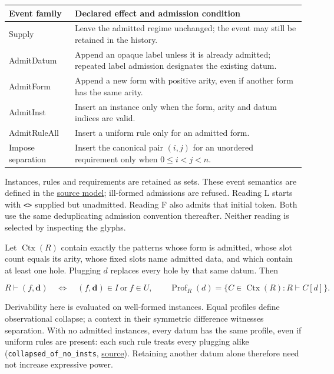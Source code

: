 \documentclass[
  11pt,
]{article}
\begin{document}
\begin{longtable}[]{@{}
  >{\raggedright\arraybackslash}p{}
  >{\raggedright\arraybackslash}p{}@{}}
\toprule\noalign{}
\begin{minipage}[b]{\linewidth}\raggedright
Event family
\end{minipage} & \begin{minipage}[b]{\linewidth}\raggedright
Declared effect and admission condition
\end{minipage} \\
\midrule\noalign{}
\endhead
\bottomrule\noalign{}
\endlastfoot
Supply & Leave the admitted regime unchanged; the event may still be
retained in the history. \\
AdmitDatum & Append an opaque label unless it is already admitted;
repeated label admission designates the existing datum. \\
AdmitForm & Append a new form with positive arity, even if another form
has the same arity. \\
AdmitInst & Insert an instance only when the form, arity and datum
indices are valid. \\
AdmitRuleAll & Insert a uniform rule only for an admitted form. \\
Impose separation & Insert the canonical pair \((i,j)\) for an unordered
requirement only when \(0\le i<j<n\). \\
\end{longtable}

Instances, rules and requirements are retained as sets. These event
semantics are defined in the
\href{code/derivation/model.py\#L106}{source model}; ill-formed
admissions are refused. Reading L starts with
\texttt{\textless{}\textgreater{}} supplied but unadmitted. Reading F
also admits that initial token. Both use the same deduplicating
admission convention thereafter. Neither reading is selected by
inspecting the glyphs.

Let \(\operatorname{Ctx}(R)\) contain exactly the patterns whose form is
admitted, whose slot count equals its arity, whose fixed slots name
admitted data, and which contain at least one hole. Plugging \(d\)
replaces every hole by that same datum. Then

\[
R\vdash(f,\mathbf d)
\quad\Longleftrightarrow\quad
(f,\mathbf d)\in I\ \text{or}\ f\in U,
\qquad
\operatorname{Prof}_R(d)
=\{C\in\operatorname{Ctx}(R):R\vdash C[d]\}.
\]

Derivability here is evaluated on well-formed instances. Equal profiles
define observational collapse; a context in their symmetric difference
witnesses separation. With no admitted instances, every datum has the
same profile, even if uniform rules are present: each such rule treats
every plugging alike (\nolinkurl{collapsed_of_no_insts},
\href{lean4/Derivation/Inertia.lean\#L37}{source}). Retaining another
datum alone therefore need not increase expressive power.
\end{document}
